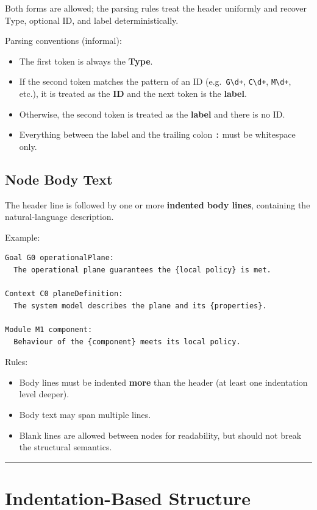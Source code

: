 \documentclass[11pt]{article}
\begin{document}
Both forms are allowed; the parsing rules treat the header uniformly and recover Type, optional ID, and label deterministically.

Parsing conventions (informal):
\begin{itemize}[leftmargin=2em]
  \item The first token is always the \textbf{Type}.
  \item If the second token matches the pattern of an ID (e.g.\ \texttt{G\textbackslash d+}, \texttt{C\textbackslash d+}, \texttt{M\textbackslash d+}, etc.), it is treated as the \textbf{ID} and the next token is the \textbf{label}.
  \item Otherwise, the second token is treated as the \textbf{label} and there is no ID.
  \item Everything between the label and the trailing colon \texttt{:} must be whitespace only.
\end{itemize}

\subsection{Node Body Text}

The header line is followed by one or more \textbf{indented body lines}, containing the natural-language description.

Example:
\begin{verbatim}
Goal G0 operationalPlane:
  The operational plane guarantees the {local policy} is met.

Context C0 planeDefinition:
  The system model describes the plane and its {properties}.

Module M1 component:
  Behaviour of the {component} meets its local policy.
\end{verbatim}

Rules:
\begin{itemize}[leftmargin=2em]
  \item Body lines must be indented \textbf{more} than the header (at least one indentation level deeper).
  \item Body text may span multiple lines.
  \item Blank lines are allowed between nodes for readability, but should not break the structural semantics.
\end{itemize}

\bigskip
\hrule
\bigskip

\section{Indentation-Based Structure}
\end{document}
